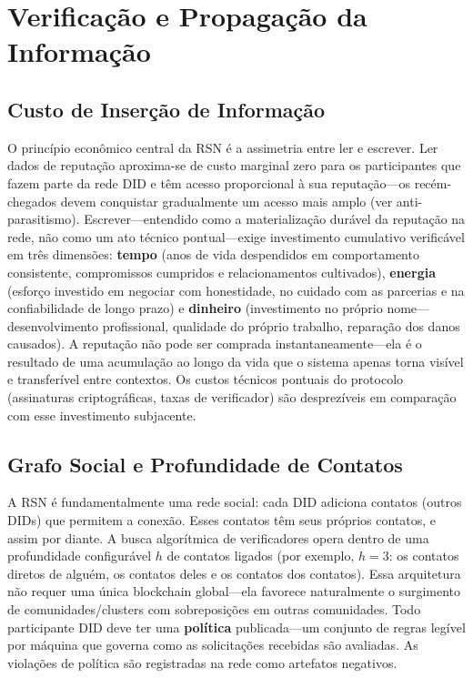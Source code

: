 \documentclass[11pt,a4paper,twocolumn]{article}
\begin{document}
\section{Verificação e Propagação da Informação}

\subsection{Custo de Inserção de Informação}

O princípio econômico central da RSN é a assimetria entre ler e escrever. Ler dados de reputação aproxima-se de custo marginal zero para os participantes que fazem parte da rede DID e têm acesso proporcional à sua reputação---os recém-chegados devem conquistar gradualmente um acesso mais amplo (ver anti-parasitismo). Escrever---entendido como a materialização durável da reputação na rede, não como um ato técnico pontual---exige investimento cumulativo verificável em três dimensões: \textbf{tempo} (anos de vida despendidos em comportamento consistente, compromissos cumpridos e relacionamentos cultivados), \textbf{energia} (esforço investido em negociar com honestidade, no cuidado com as parcerias e na confiabilidade de longo prazo) e \textbf{dinheiro} (investimento no próprio nome---desenvolvimento profissional, qualidade do próprio trabalho, reparação dos danos causados). A reputação não pode ser comprada instantaneamente---ela é o resultado de uma acumulação ao longo da vida que o sistema apenas torna visível e transferível entre contextos. Os custos técnicos pontuais do protocolo (assinaturas criptográficas, taxas de verificador) são desprezíveis em comparação com esse investimento subjacente.

\subsection{Grafo Social e Profundidade de Contatos}

A RSN é fundamentalmente uma rede social: cada DID adiciona contatos (outros DIDs) que permitem a conexão. Esses contatos têm seus próprios contatos, e assim por diante. A busca algorítmica de verificadores opera dentro de uma profundidade configurável $h$ de contatos ligados (por exemplo, $h=3$: os contatos diretos de alguém, os contatos deles e os contatos dos contatos). Essa arquitetura não requer uma única blockchain global---ela favorece naturalmente o surgimento de comunidades/clusters com sobreposições em outras comunidades. Todo participante DID deve ter uma \textbf{política} publicada---um conjunto de regras legível por máquina que governa como as solicitações recebidas são avaliadas. As violações de política são registradas na rede como artefatos negativos.
\end{document}
